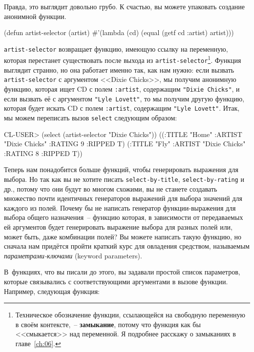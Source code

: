 Правда, это выглядит довольно грубо. К счастью, вы можете упаковать создание анонимной функции.

\begin{myverb}
(defun artist-selector (artist)
  #'(lambda (cd) (equal (getf cd :artist) artist)))
\end{myverb}

\lstinline{artist-selector} возвращает функцию, имеющую ссылку на переменную, которая
перестанет существовать после выхода из \lstinline{artist-selector}\footnote{Техническое
  обозначение функции, ссылающейся на свободную переменную в своём контексте,~--
  \textbf{замыкание}, потому что функция как бы <<смыкается>> над переменной. Я подробнее
  расскажу о замыканиях в главе~\ref{ch:06}.}. Функция выглядит странно, но она работает
именно так, как нам нужно: если вызвать \lstinline{artist-selector} с аргументом <<Dixie
Chicks>>, мы получим анонимную функцию, которая ищет CD с полем \lstinline{:artist},
содержащим \lstinline{"Dixie Chicks"}, и если вызвать её с аргументом 
\lstinline{"Lyle Lovett"}, то мы получим другую функцию, которая будет искать CD с полем
\lstinline{:artist}, содержащим \lstinline{"Lyle Lovett"}. Итак, мы можем переписать вызов
\lstinline{select} следующим образом:

\begin{myverb}
CL-USER> (select (artist-selector "Dixie Chicks"))
  ((:TITLE "Home" :ARTIST "Dixie Chicks" :RATING 9 :RIPPED T)
   (:TITLE "Fly" :ARTIST "Dixie Chicks" :RATING 8 :RIPPED T))
\end{myverb}

Теперь нам понадобится больше функций, чтобы генерировать выражения для выбора. Но так как
вы не хотите писать \lstinline{select-by-title}, \lstinline{select-by-rating} и др., потому что они
будут во многом схожими, вы не станете создавать множество почти идентичных генераторов
выражений для выбора значений для каждого из полей. Почему бы не написать генератор
функции-выражения для выбора общего назначения~-- функцию которая, в зависимости от
передаваемых ей аргументов будет генерировать выражение выбора для разных полей или,
может быть, даже комбинации полей? Вы можете напи\-сать такую функцию, но сначала нам
придётся пройти краткий курс для овладения средством, называемым
\textit{параметрами-ключами} (keyword parameters).

В~функциях, что вы писали до этого, вы задавали простой список параметров, которые
связывались с соответствующими аргументами в вызове функции. Например, следующая функция:

